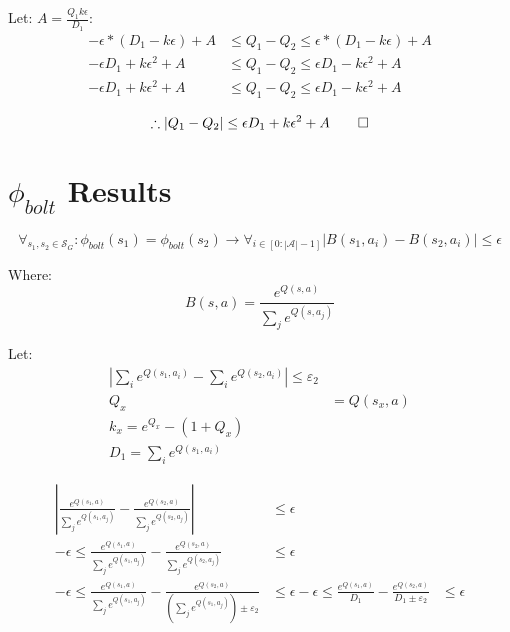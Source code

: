 \documentclass[11pt]{amsart}
\begin{document}
Let: $A = \frac{Q_1 k \epsilon}{D_1}$:
\begin{align*}
-\epsilon*(D_1 - k \epsilon) + A &\leq Q_1 - Q_2 \leq \epsilon*(D_1 - k \epsilon) + A \\
-\epsilon D_1 + k \epsilon^2 + A &\leq Q_1 - Q_2 \leq \epsilon D_1 - k \epsilon^2 + A \\
-\epsilon D_1 + k \epsilon^2 + A &\leq Q_1 - Q_2 \leq \epsilon D_1 - k \epsilon^2 + A
\end{align*}

\begin{equation}
\therefore |Q_1 - Q_2| \leq \epsilon D_1 + k \epsilon^2 + A \qed
\end{equation}



\newpage
\section{$\phi_{bolt}$ Results}

\begin{equation}
\forall_{s_1, s_2 \in \mathcal{S}_G} : \phi_{bolt}(s_1) = \phi_{bolt}(s_2) \rightarrow \forall_{i \in [0:|\mathcal{A}| - 1]} | B(s_1, a_i) - B(s_2, a_i) | \leq \epsilon
\label{eq:phi_bolt}
\end{equation}

Where:
\begin{equation}
B(s,a) = \frac{e^{Q(s,a)}}{\sum_j e^{Q(s,a_j)}}
\end{equation}

Let:
\begin{align}
|\sum_i e^{Q(s_1,a_i)} - \sum_i e^{Q(s_2,a_i)} | \leq \varepsilon_2 \\
Q_x &= Q(s_x,a) \\
k_x = e^{Q_x} - (1 + Q_x) \\
D_1 = \sum_i e^{Q(s_1,a_i)}
\end{align}


\begin{align*}
|\frac{e^{Q(s_1,a)}}{\sum_j e^{Q(s_1,a_j)}} - \frac{e^{Q(s_2,a)}}{\sum_j e^{Q(s_2,a_j)}} | &\leq \epsilon \\
- \epsilon \leq \frac{e^{Q(s_1,a)}}{\sum_j e^{Q(s_1,a_j)}} - \frac{e^{Q(s_2,a)}}{\sum_j e^{Q(s_2,a_j)}} &\leq \epsilon \\
- \epsilon \leq \frac{e^{Q(s_1,a)}}{\sum_j e^{Q(s_1,a_j)}} - \frac{e^{Q(s_2,a)}}{\left(\sum_j e^{Q(s_1,a_j)}\right) \pm \varepsilon_2} &\leq \epsilon 
- \epsilon \leq \frac{e^{Q(s_1,a)}}{D_1} - \frac{e^{Q(s_2,a)}}{D_1 \pm \varepsilon_2} &\leq \epsilon 
\end{align*}
\end{document}

